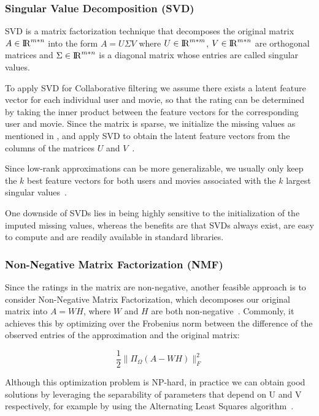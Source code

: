 \documentclass[10pt,conference,compsocconf]{IEEEtran}
\begin{document}
    \subsubsection{Singular Value Decomposition (SVD)}

    SVD is a matrix factorization technique that decomposes the original matrix $A \in {\rm I\!R}^{m*n} $ into the form $ A = U \Sigma V $ where $U \in {\rm I\!R}^{m*m}$,  $V  \in {\rm I\!R}^{m*n}$ are orthogonal matrices and $\Sigma \in {\rm I\!R}^{m*n}$ is a diagonal matrix whose entries are called singular values.

    To apply SVD for Collaborative filtering we assume there exists a latent feature vector for each individual user and movie, so that the rating can be determined by taking the inner product between the feature vectors for the corresponding user and movie.
    Since the matrix is sparse, we initialize the missing values as mentioned in , and apply SVD to obtain the latent feature vectors from the columns of the matrices $U$ and $V$~\cite{svd}.

    Since low-rank approximations can be more generalizable, we usually only keep the $k$ best feature vectors for both users and movies associated with the $k$ largest singular values~\cite{Eckart1936}.%

    One downside of SVDs lies in being highly sensitive to the initialization of the imputed missing values, whereas the benefits are that SVDs always exist, are easy to compute and are readily available in standard libraries.

    \subsubsection{Non-Negative Matrix Factorization (NMF)}

    Since the ratings in the matrix are non-negative, another feasible approach is to consider Non-Negative Matrix Factorization, which decomposes our original matrix into $A = WH$, where $W$ and $H$ are both non-negative~\cite{gillis2014nonnegative}.
    Commonly, it achieves this by optimizing over the Frobenius norm between the difference of the observed entries of the approximation and the original matrix:

    $$ \frac{1}{2}\|\Pi_{\Omega}(A - WH)\|^2_F$$

    Although this optimization problem is NP-hard, in practice we can obtain good solutions by leveraging the separability of parameters that depend on U and V respectively, for example by using the Alternating Least Squares algorithm~\cite{als}.
\end{document}
